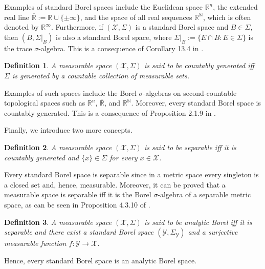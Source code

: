 \documentclass[12pt]{article}
\newtheorem{definition}{Definition}[section]
\begin{document}
Examples of standard Borel spaces include the Euclidean space $\mathbb{R}^n$, the extended real line $\overline{\mathbb{R}}:=\mathbb{R}\cup \{\pm \infty \}$, and the space of all real sequences $\mathbb{R}^\mathbb{N}$, which is often denoted by $\mathbb{R}^\infty $. Furthermore, if $(\mathcal{X},\Sigma )$ is a standard Borel space and $B\in \Sigma $, then $(B,\Sigma |_B)$ is also a standard Borel space, where $\Sigma |_B:=\{E\cap B:E\in \Sigma \}$ is the trace $\sigma$-algebra. This is a consequence of Corollary 13.4 in \cite{Kechris1995}.

\begin{definition}\label{def:countable_space}
A measurable space $(\mathcal{X},\Sigma )$ is said to be countably generated iff $\Sigma$ is generated by a countable collection of measurable sets.
\end{definition}

Examples of such spaces include the Borel $\sigma$-algebras on second-countable topological spaces such as $\mathbb{R}^n$, $\overline{\mathbb{R}}$, and $\mathbb{R}^\mathbb{N}$. Moreover, every standard Borel space is countably generated. This is a consequence of Proposition 2.1.9 in \cite{Srivastava1998}.

Finally, we introduce two more concepts.

\begin{definition}\label{def:separable}
A measurable space $(\mathcal{X},\Sigma )$ is said to be separable iff it is countably generated and $\{x\}\in \Sigma $ for every $x\in \mathcal{X}$.
\end{definition}

Every standard Borel space is separable since in a metric space every singleton is a closed set and, hence, measurable. Moreover, it can be proved that a measurable space is separable iff it is the Borel $\sigma$-algebra of a separable metric space, as can be seen in Proposition 4.3.10 of \cite{Doberkat2015}.



\begin{definition}\label{def:analytic_Borel}
A measurable space $(\mathcal{X},\Sigma )$ is said to be analytic Borel iff it is separable and there exist a standard Borel space $(\mathcal{Y},\Sigma _\mathcal{Y})$ and a surjective measurable function $f:\mathcal{Y}\to \mathcal{X}$.
\end{definition}

Hence, every standard Borel space is an analytic Borel space.
\end{document}
